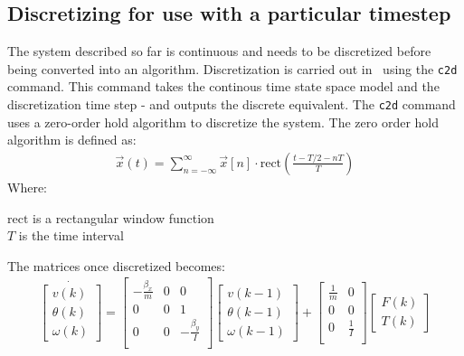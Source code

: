\subsection{Discretizing for use with a particular timestep}

The system described so far is continuous and needs to be discretized before being converted into an algorithm. Discretization is carried out in \MATLAB \ using the \texttt{c2d} command. This command takes the continous time state space model and the discretization time step - and outputs the discrete equivalent. The \texttt{c2d} command uses a zero-order hold algorithm to discretize the system.
The zero order hold algorithm is defined as:
\begin{align}
\vec{x}(t)  = \sum_{n = -\infty}^{\infty} \vec{x}[n] \cdot \text{rect}\left(\frac{t-T/2 - nT}{T}\right)
\end{align}
\noindent Where:
\begin{ffk}
$\text{rect}$ is a rectangular window function\\
$T$ is the time interval
\end{ffk}
The matrices once discretized becomes:
\begin{align}
\dot{
	\begin{bmatrix}
	 v(k)\\
	 \theta(k)\\
	 \omega(k)
	\end{bmatrix}
}
=
\begin{bmatrix}
 -\frac{\beta_{x}}{m} & 0 & 0\\
 0 & 0 & 1\\
 0 & 0 & - \frac{\beta_{y}}{I}\\
\end{bmatrix}
\begin{bmatrix}
v(k-1)\\
\theta(k-1)\\
\omega(k-1)
\end{bmatrix}
+
\begin{bmatrix}
\frac{1}{m} & 0\\
0 & 0\\
0 & \frac{1}{I}\\
\end{bmatrix}
\begin{bmatrix}
F(k)\\
T(k)
\end{bmatrix}
\label{eq:ssmodel}
\end{align}

